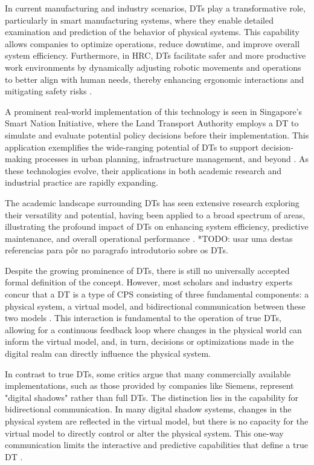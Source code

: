In current manufacturing and industry scenarios, \ac{DTs} play a transformative role, particularly in smart manufacturing systems, where they enable detailed examination and prediction of the behavior of physical systems. This capability allows companies to optimize operations, reduce downtime, and improve overall system efficiency. Furthermore, in \ac{HRC}, \ac{DTs} facilitate safer and more productive work environments by dynamically adjusting robotic movements and operations to better align with human needs, thereby enhancing ergonomic interactions and mitigating safety risks \cite{8477101}.

A prominent real-world implementation of this technology is seen in Singapore's Smart Nation Initiative, where the Land Transport Authority employs a \ac{DT} to simulate and evaluate potential policy decisions before their implementation. This application exemplifies the wide-ranging potential of \ac{DTs} to support decision-making processes in urban planning, infrastructure management, and beyond \cite{isprs-archives-XLII-4-W7-37-2017}. As these technologies evolve, their applications in both academic research and industrial practice are rapidly expanding.

The academic landscape surrounding \ac{DTs} has seen extensive research exploring their versatility and potential, having been applied to a broad spectrum of areas, illustrating the profound impact of DTs on enhancing system efficiency, predictive maintenance, and overall operational performance \cite{8361285, TAO2018169, isprs-archives-XLII-4-W7-37-2017, 10.1007/978-3-030-23162-0_19, 6296978}.
*TODO: usar uma destas referencias para pôr no paragrafo introdutorio sobre os DTs.

Despite the growing prominence of \ac{DTs}, there is still no universally accepted formal definition of the concept. However, most scholars and industry experts concur that a \ac{DT} is a type of \ac{CPS} consisting of three fundamental components: a physical system, a virtual model, and bidirectional communication between these two models \cite{TaoFei, 8477101, ROSEN2015567}.
This interaction is fundamental to the operation of true \ac{DTs}, allowing for a continuous feedback loop where changes in the physical world can inform the virtual model, and, in turn, decisions or optimizations made in the digital realm can directly influence the physical system.

In contrast to true \ac{DTs}, some critics argue that many commercially available implementations, such as those provided by companies like Siemens, represent "digital shadows" rather than full \ac{DTs}. The distinction lies in the capability for bidirectional communication. In many digital shadow systems, changes in the physical system are reflected in the virtual model, but there is no capacity for the virtual model to directly control or alter the physical system. This one-way communication limits the interactive and predictive capabilities that define a true DT \cite{CIMINO2019103130}.

